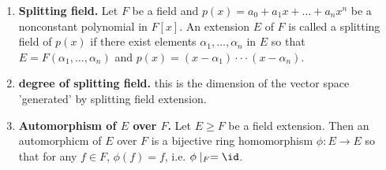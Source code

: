 \begin{enumerate}
	\item \textbf{Splitting field. } Let $F$ be a field and $p(x) = a_0 + a_1x + \dots + a_nx^n$ be a nonconstant polynomial in $F[x]$. An extension $E$ of $F$ is called a splitting field of $p(x)$ if there exist elements $\alpha_1,\dots,\alpha_n$ in $E$ so that $E = F(\alpha_1,\dots,\alpha_n)$ and $p(x) = (x-\alpha_1) \cdot \cdot \cdot (x-\alpha_n)$. 
	\item \textbf{degree of splitting field. } this is the dimension of the vector space 'generated' by splitting field extension. 
	\item \textbf{Automorphism of $E$ over $F$. } Let $E \geq F$ be a field extension. Then an automorphicm of $E$ over $F$ is a bijective ring homomorphism $\phi: E \to E$ so that for any $f \in F$, $\phi(f)=f$, i.e. $\phi \mid_F = \id$. 
\end{enumerate}



